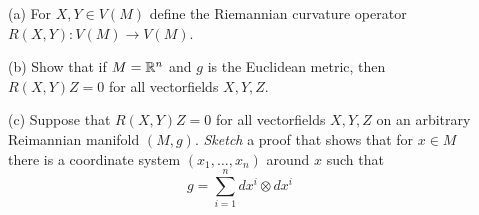\documentclass{article}
\begin{document}
\begin{description}
\item[\quad] (a)
For $X,Y \in V(M)$ define the Riemannian curvature operator
$R(X,Y): V(M) \to V(M)$.

\item[\quad] (b)
Show that if $M= \Bbb R^n$ and $g$ is the Euclidean metric, then
$R(X,Y)Z = 0$ for all vectorfields $X,Y,Z$.

\item[\quad] (c)
Suppose that $R(X,Y)Z = 0$ for all vectorfields $X,Y,Z$ on an arbitrary
Reimannian manifold $(M,g)$. {\it Sketch} a proof that shows that for
$x \in M$ there is a coordinate system $(x_1, \dots, x_n)$ around
$x$ such that
$$g = \sum^n_{i=1} dx^i \otimes dx^i$$





\end{description}    
\end{document}

